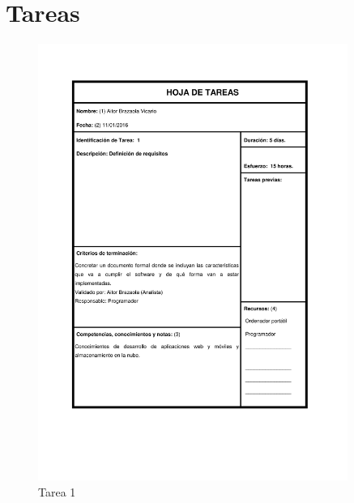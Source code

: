 \documentclass{DeustoFDP}
\begin{document}
\section{Tareas}
\begin{figure}[H]
    \centering
    \includegraphics[width=0.9\textwidth]{fig/Tareas/1}
    \caption{Tarea 1}
    \label{fig:t1}
\end{figure}
\end{document}
